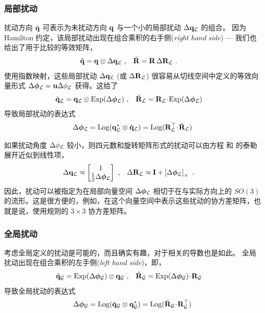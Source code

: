 \subsubsection{局部扰动}

扰动方向 $\tilde{{\bf q}}$ 可表示为未扰动方向 ${\bf q}$ 与一个小的局部扰动 ${\Delta{\bf q}_{\mathcal{L}}}$ 的组合。 
因为 Hamilton 约定，该局部扰动出现在组合乘积的右手侧(\emph{right hand side}) --- 我们也给出了用于比较的等效矩阵，
%
\begin{align}
\tilde{{\bf q}} &= {\bf q}\otimes{\Delta{\bf q}_{\mathcal{L}}}
~, &
\tilde{{\bf R}} &= {\bf R}\,\Delta{\bf R}_{\mathcal{L}}
~.
\end{align}%
%
使用指数映射，这些局部扰动 $\Delta{\bf q}_{\mathcal{L}}$ (或 $\Delta{\bf R}_{\mathcal{L}}$) 很容易从切线空间中定义的等效向量形式 $\Delta{\bm \phi}_{\mathcal{L}}={\bf u}\Delta\phi_{\mathcal{L}}$ 获得。这给了
%
\begin{align}
\tilde{{\bf q}}_{\mathcal{L}} &= {\bf q}_{\mathcal{L}}\otimes\operatorname*{Exp}(\Delta{\bm \phi}_{\mathcal{L}})
~,& 
\tilde{{\bf R}}_{\mathcal{L}} &= {\bf R}_{\mathcal{L}}\!\cdot\!\operatorname*{Exp}(\Delta{\bm \phi}_{\mathcal{L}})
\end{align}
%
导致局部扰动的表达式 
%
\begin{align}
\Delta{\bm \phi}_{\mathcal{L}} = \operatorname*{Log}({\bf q}_{\mathcal{L}}^*\otimes\tilde{{\bf q}}_{\mathcal{L}}) = \operatorname*{Log}({\bf R}_{\mathcal{L}}^{\top}\!\cdot\!\tilde{{\bf R}}_{\mathcal{L}})
\end{align}
 

如果扰动角度 $\Delta\phi_{\mathcal{L}}$ 较小，则四元数和旋转矩阵形式的扰动可以由方程  和  的泰勒展开近似到线性项，
%
\begin{align}
{\Delta{\bf q}_{\mathcal{L}}}& \approx \begin{bmatrix}
1\\\frac{1}{2}\Delta{\bm \phi}_{\mathcal{L}}
\end{bmatrix}
~,
&
\Delta{\bf R}_{\mathcal{L}}& \approx
{\bf I}+\left[\Delta{\bm \phi}_{\mathcal{L}}\right]_\times
~.
\end{align}%
%
因此，扰动可以被指定为在局部向量空间 $\Delta{\bm \phi}_{\mathcal{L}}$ 相切于在与实际方向上的 $SO(3)$ 的流形。这是很方便的，例如，在这个向量空间中表示这些扰动的协方差矩阵，也就是说，使用规则的 $3\times 3$ 协方差矩阵。

\subsubsection{全局扰动}

考虑全局定义的扰动是可能的，而且确实有趣，对于相关的导数也是如此。 
全局扰动出现在组合乘积的左手侧(\emph{left hand side})，即，
%
%
\begin{align}
\tilde{{\bf q}}_{\mathcal{G}} &= \operatorname*{Exp}(\Delta{\bm \phi}_{\mathcal{G}})\otimes{\bf q}_{\mathcal{G}}
~,& 
\tilde{{\bf R}}_{\mathcal{G}} &= \operatorname*{Exp}(\Delta{\bm \phi}_{\mathcal{G}})\!\cdot\!{\bf R}_{\mathcal{G}}
\end{align}
%
导致全局扰动的表达式 
%
\begin{align}
\Delta{\bm \phi}_{\mathcal{G}} = \operatorname*{Log}(\tilde{{\bf q}}_{\mathcal{G}}\otimes{\bf q}_{\mathcal{G}}^*) = \operatorname*{Log}(\tilde{{\bf R}}_{\mathcal{G}}\!\cdot\!{\bf R}_{\mathcal{G}}^{\top})
\end{align}


